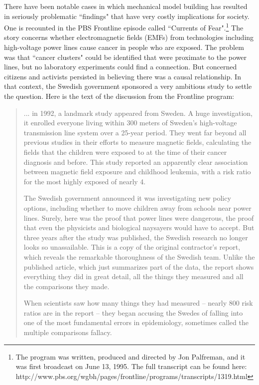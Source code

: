 \documentclass[11pt,openany]{book}\usepackage[]{graphicx}\usepackage[]{color}
\begin{document}
There have been notable cases in which mechanical model building has resulted in seriously problematic ``findings" that have very costly implications for society. One is recounted in the PBS Frontline episode called ``Currents of Fear".\footnote{The program was written, produced  and directed by Jon Palfreman, and it was first broadcast on June 13, 1995. The full transcript can be found here: http://www.pbs.org/wgbh/pages/frontline/programs/transcripts/1319.html} The story concerns whether electromagnetic fields (EMFs) from technologies including high-voltage power lines cause cancer in people who are exposed. The problem was that ``cancer clusters" could be identified that were proximate to the power lines, but no laboratory experiments could find a connection. But concerned citizens and activists persisted in believing there was a causal relationship. In that context, the Swedish government sponsored a very ambitious study to settle the question. Here is the text of the discussion from  the Frontline program:

\begin{quote}
... in 1992, a landmark study appeared from Sweden. A huge investigation, it enrolled everyone  living within 300 meters of Sweden's high-voltage  transmission line system over a 25-year period.  They went far beyond all previous studies in their efforts to measure magnetic fields, calculating the fields that the children were exposed to at the time of their cancer diagnosis and before. This study  reported an apparently clear association between magnetic field exposure and childhood leukemia, with a risk ratio for the most highly exposed of nearly 4.

The Swedish government announced it was investigating new policy options, including whether to  move children away from schools near power lines. Surely, here was the proof that power lines were  dangerous, the proof that even the physicists and biological naysayers would have to accept. But three years after the study was published, the Swedish research no longer looks so unassailable. This is a  copy of the original contractor's report, which reveals the remarkable thoroughness of the Swedish team.  Unlike the published article, which just summarizes part of the data, the report shows everything they did in  great detail, all the things they measured and all the comparisons they made.

When scientists saw how many things they had measured -- nearly 800 risk ratios are in the report -- they began accusing the Swedes of falling into one of the most fundamental errors in epidemiology, sometimes called the multiple comparisons fallacy.
\end{quote}
\end{document}
